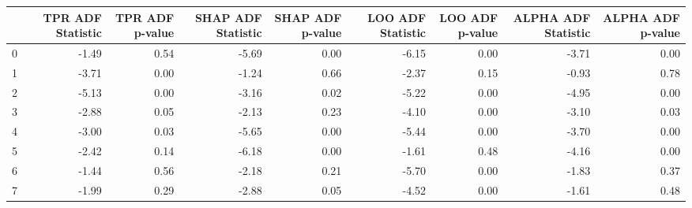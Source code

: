 \begin{tabular}{lrrrrrrrr}
\toprule
 & TPR ADF Statistic & TPR ADF p-value & SHAP ADF Statistic & SHAP ADF p-value & LOO ADF Statistic & LOO ADF p-value & ALPHA ADF Statistic & ALPHA ADF p-value \\
\midrule
0 & -1.49 & 0.54 & -5.69 & 0.00 & -6.15 & 0.00 & -3.71 & 0.00 \\
1 & -3.71 & 0.00 & -1.24 & 0.66 & -2.37 & 0.15 & -0.93 & 0.78 \\
2 & -5.13 & 0.00 & -3.16 & 0.02 & -5.22 & 0.00 & -4.95 & 0.00 \\
3 & -2.88 & 0.05 & -2.13 & 0.23 & -4.10 & 0.00 & -3.10 & 0.03 \\
4 & -3.00 & 0.03 & -5.65 & 0.00 & -5.44 & 0.00 & -3.70 & 0.00 \\
5 & -2.42 & 0.14 & -6.18 & 0.00 & -1.61 & 0.48 & -4.16 & 0.00 \\
6 & -1.44 & 0.56 & -2.18 & 0.21 & -5.70 & 0.00 & -1.83 & 0.37 \\
7 & -1.99 & 0.29 & -2.88 & 0.05 & -4.52 & 0.00 & -1.61 & 0.48 \\
\bottomrule
\end{tabular}
